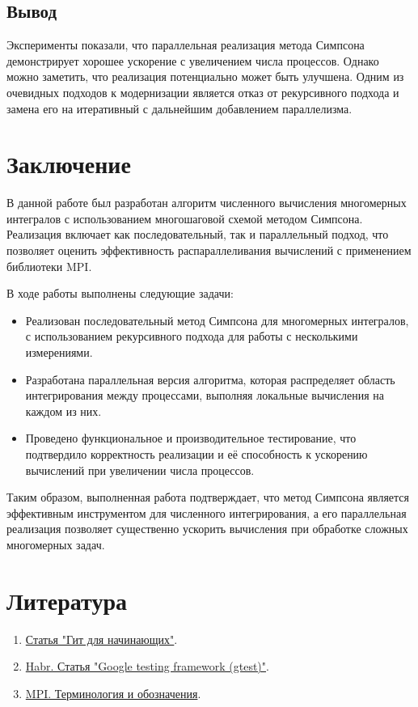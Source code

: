 \documentclass[12pt]{article}
\begin{document}
\subsection*{Вывод}
Эксперименты показали, что параллельная реализация метода Симпсона демонстрирует хорошее ускорение с увеличением числа процессов. Однако можно заметить, что реализация потенциально может быть улучшена. Одним из очевидных подходов к модернизации является отказ от рекурсивного подхода и замена его на итеративный с дальнейшим добавлением параллелизма.

\section*{Заключение}

В данной работе был разработан алгоритм численного вычисления многомерных интегралов с использованием многошаговой схемой методом Симпсона. Реализация включает как последовательный, так и параллельный подход, что позволяет оценить эффективность распараллеливания вычислений с применением библиотеки MPI.

В ходе работы выполнены следующие задачи:
\begin{itemize}
    \item Реализован последовательный метод Симпсона для многомерных интегралов, с использованием рекурсивного подхода для работы с несколькими измерениями.
    \item Разработана параллельная версия алгоритма, которая распределяет область интегрирования между процессами, выполняя локальные вычисления на каждом из них.
    \item Проведено функциональное и производительное тестирование, что подтвердило корректность реализации и её способность к ускорению вычислений при увеличении числа процессов.
\end{itemize}

Таким образом, выполненная работа подтверждает, что метод Симпсона является эффективным инструментом для численного интегрирования, а его параллельная реализация позволяет существенно ускорить вычисления при обработке сложных многомерных задач.

\section*{Литература}

\begin{enumerate}
    \item \href{https://proglib.io/p/git-for-half-an-hour}{Статья "Гит для начинающих"}.
    \item \href{https://habr.com/ru/articles/119090/}{Habr. Статья "Google testing framework (gtest)"}.
    \item \href{https://parallel.ru/vvv/mpi.html#p1}{MPI. Терминология и обозначения}.
\end{enumerate}
\end{document}
